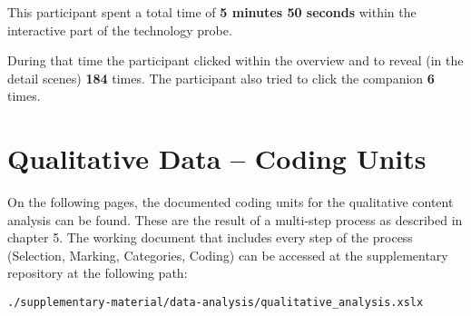 \begin{appendices}
  This participant spent a total time of \textbf{5 minutes 50 seconds} within the interactive part of the technology probe.

  During that time the participant clicked within the overview and to reveal (in the detail scenes) \textbf{184} times. The participant also tried to click the companion \textbf{6} times.



  \newpage
  \section{Qualitative Data -- Coding Units}
  \label{append:coding}

  On the following pages, the documented coding units for the qualitative content analysis can be found. These are the result of a multi-step process as described in chapter 5. The working document that includes every step of the process (Selection, Marking, Categories, Coding) can be accessed at the supplementary repository at the following path:

  \begin{center}
    \texttt{./supplementary-material/data-analysis/qualitative\_analysis.xslx}
  \end{center}


\end{appendices}
